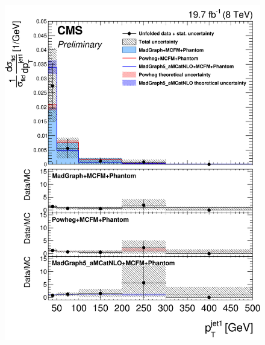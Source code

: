 \begin{figure}[hbtp]
\begin{center}
    \includegraphics[width=\cmsFigWidth]{Figures/DiffCrossSecZZTo2e2mPtJet1_Unfolded_fr_MadGraph_norm.png}       

\end{center}
\end{figure}
